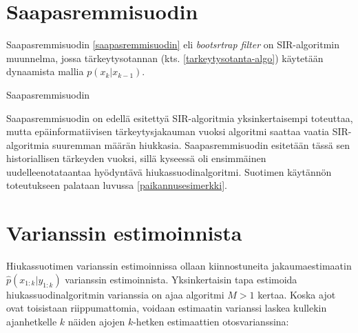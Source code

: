 \documentclass[
  12pt,
  a4paper, twoside]{book}
\begin{document}
\section{Saapasremmisuodin}

Saapasremmisuodin \ref{saapasremmisuodin} eli \emph{bootsrtrap filter} on SIR-algoritmin muunnelma, jossa tärkeytysotannan (kts. \ref{tarkeytysotanta-algo}) käytetään dynaamista mallia \(p(x_k|x_{k-1})\).

\begin{algorithm}[H]
\label{saapasremmisuodin}
\DontPrintSemicolon
\SetAlgoShortEnd
{}
\caption{Saapasremmisuodin}
\end{algorithm}

Saapasremmisuodin on edellä esitettyä SIR-algoritmia yksinkertaisempi toteuttaa, mutta epäinformatiivisen tärkeytysjakauman vuoksi algoritmi saattaa vaatia SIR-algoritmia suuremman määrän hiukkasia. Saapasremmisuodin esitetään tässä sen historiallisen tärkeyden vuoksi, sillä kyseessä oli ensimmäinen uudelleenotataantaa hyödyntävä hiukassuodinalgoritmi. Suotimen käytännön toteutukseen palataan luvussa \ref{paikannusesimerkki}.

\section{Varianssin estimoinnista} \label{varianssin-estimointi}

Hiukassuotimen varianssin estimoinnissa ollaan kiinnostuneita jakaumaestimaatin \(\hat{p}(x_{1:k}|y_{1:k})\) varianssin estimoinnista. Yksinkertaisin tapa estimoida hiukassuodinalgoritmin varianssia on ajaa algoritmi \(M > 1\) kertaa. Koska ajot ovat toisistaan riippumattomia, voidaan estimaatin varianssi laskea kullekin ajanhetkelle \(k\) näiden ajojen \(k\)-hetken estimaattien otosvarianssina:
\end{document}

